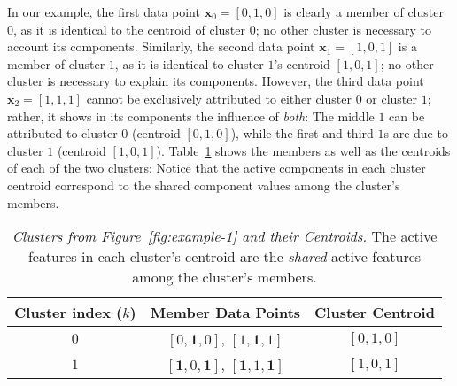 {In our example, the first data point $\textbf{x}_0 = [0,1,0]$ is clearly a member of cluster 0, as it is identical to the centroid of cluster 0; no other cluster is necessary to account its components. %
Similarly, the second data point $\textbf{x}_1 = [1,0,1]$ is a member of cluster $1$, as it is identical to cluster $1$'s centroid $[1,0,1]$; no other cluster is necessary to explain its components. %
However, the third data point $\textbf{x}_2 = [1,1,1]$ cannot be exclusively attributed to either cluster $0$ or cluster $1$; rather, it shows in its components the influence of \emph{both}: The middle $1$ can be attributed to cluster $0$
(centroid $ [0,1,0]$),
while the first and third $1$s are due to cluster $1$ (centroid $ [1,0,1]$). 
Table~\ref{tab:cl-members} shows the members as well as the centroids of each of the two clusters: Notice that the active components in each cluster centroid correspond to the shared component values among the cluster's members.

 \begin{table}[!h]
\begin{mdframed}
\centering
\setlength{\extrarowheight}{8pt}
\begin{tabular}{ccc}
\toprule
Cluster index ($k$) & Member Data Points & Cluster Centroid \\ \midrule
 $0$ &  $[0,\mathbf{1},0]$, $[1,\mathbf{1},1]$ & $[0,1,0]$\\ 
 $1$  & $[\mathbf{1},0,\mathbf{1}]$, $[\mathbf{1},1,\mathbf{1}]$ & $[1,0,1]$\\
 \bottomrule
 \end{tabular}
\caption{\emph{Clusters from Figure~\ref{fig:example-1} and their Centroids.} The active features in each cluster's centroid are the \emph{shared} active features among the cluster's members.}
\label{tab:cl-members}
\end{mdframed}
\end{table}


}
